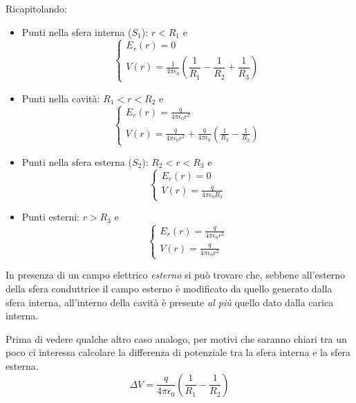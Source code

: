 Ricapitolando:
\begin{itemize}
	\item Punti nella sfera interna ($S_1$): $r<R_1$ e
	\begin{equation*}
		\begin{cases}
			E_{r}(r)=0\\
			V(r)=\frac{1}{4\pi\epsilon_0}\left(\dfrac{1}{R_1}-\dfrac{1}{R_2}+\dfrac{1}{R_3}\right)
		\end{cases}
	\end{equation*}
	\item Punti nella cavità: $R_1<r<R_2$ e
	\begin{equation*}
		\begin{cases}
			E_{r}(r)=\frac{q}{4\pi\epsilon_0r^2}\\
			V(r)=\frac{q}{4\pi\epsilon_0r^2}+\frac{q}{4\pi\epsilon_0}\left(\frac{1}{R_3}-\frac{1}{R_2}\right)
		\end{cases}
	\end{equation*}
	\item Punti nella sfera esterna ($S_2$): $R_2<r<R_3$ e
	\begin{equation*}
		\begin{cases}
			E_{r}(r)=0\\
			V(r)=\frac{q}{4\pi\epsilon_0R_3}
		\end{cases}
	\end{equation*}
	\item Punti esterni: $r>R_3$ e
	\begin{equation*}
		\begin{cases}
			E_{r}(r)=\frac{q}{4\pi\epsilon_0 r^2}\\
			V(r)=\frac{q}{4\pi\epsilon_0r^2}
		\end{cases}
	\end{equation*}
\end{itemize}
In presenza di un campo elettrico \textit{esterno} si può trovare che, sebbene all'esterno della sfera conduttrice il campo esterno è modificato da quello generato dalla sfera interna, all'interno della cavità è presente \textit{al più} quello dato dalla carica interna.

Prima di vedere qualche altro caso analogo, per motivi che saranno chiari tra un poco ci interessa calcolare la differenza di potenziale tra la sfera interna e la sfera esterna.
\begin{equation*}
	\Delta V=\frac{q}{4\pi\epsilon_0}\left(\frac{1}{R_1}-\frac{1}{R_2}\right)
\end{equation*}


